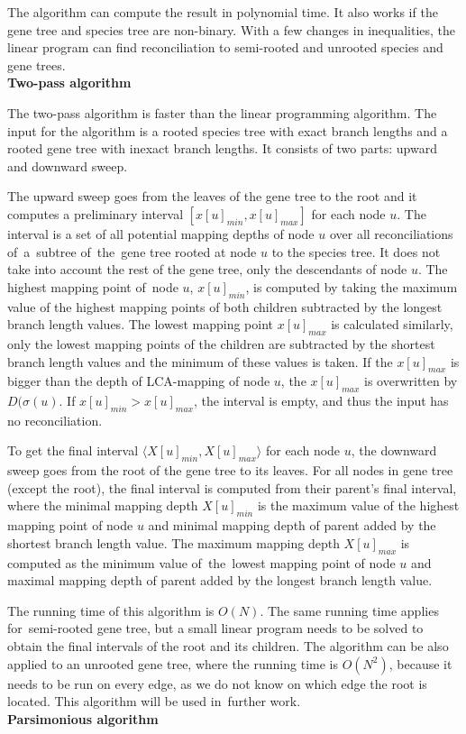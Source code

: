 The algorithm can compute the result in polynomial time. It also works if the gene tree and species tree are non-binary. With a few changes in inequalities, the linear program can find reconciliation to semi-rooted and unrooted species and gene trees.\\
\textbf{Two-pass algorithm} \label{two-pass_algorithm}

The two-pass algorithm is faster than the linear programming algorithm. The input for the algorithm is a rooted species tree with exact branch lengths and a rooted gene tree with inexact branch lengths. It consists of two parts: upward and downward sweep. 

The upward sweep goes from the leaves of the gene tree to the root and it computes a preliminary interval $[ x[u]_{min}, x[u]_{max} ]$ for each node $u$. The interval is a set of all potential mapping depths of node $u$ over all reconciliations of~a~subtree of~the~gene tree rooted at node $u$ to the species tree. It does not take into account the rest of the gene tree, only the descendants of node $u$. The highest mapping point of~node $u$, $x[u]_{min}$, is computed by taking the maximum value of the highest mapping points of both children subtracted by the longest branch length values. The lowest mapping point $x[u]_{max}$ is calculated similarly, only the lowest mapping points of the children are subtracted by the shortest branch length values and the minimum of these values is taken. If the $x[u]_{max}$ is bigger than the depth of LCA-mapping of node $u$, the $x[u]_{max}$ is overwritten by $D(\sigma(u)$. If $x[u]_{min} > x[u]_{max}$, the interval is empty, and thus the input has no reconciliation.

To get the final interval $\langle X[u]_{min}, X[u]_{max} \rangle$ for each node $u$, the downward sweep goes from the root of the gene tree to its leaves.
For all nodes in gene tree (except the root), the final interval is computed from their parent's final interval, where the minimal mapping depth $X[u]_{min}$ is the maximum value of the highest mapping point of node $u$ and minimal mapping depth of parent added by the shortest branch length value. The maximum mapping depth $X[u]_{max}$ is computed as the minimum value of~the~lowest mapping point of node $u$ and maximal mapping depth of parent added by the longest branch length value.

The running time of this algorithm is $O(N)$. The same running time applies for~semi-rooted gene tree, but a small linear program needs to be solved to obtain the final intervals of the root and its children. The algorithm can be also applied to an unrooted gene tree, where the running time is $O(N^2)$, because it needs to be run on every edge, as we do not know on which edge the root is located. This algorithm will be used in~further work.\\
\textbf{Parsimonious algorithm}

